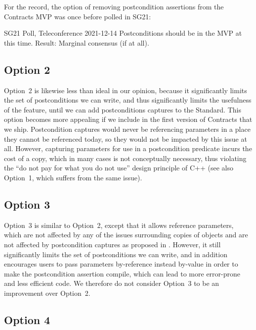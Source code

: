For the record, the option of removing postcondition assertions from the Contracts MVP was once before polled in SG21:

\begin{wgpoll}{SG21 Poll, Teleconference 2021-12-14}
Postconditions should be in the MVP at this time.
Result: Marginal consensus (if at all).
\end{wgpoll}

\subsection*{Option 2}

Option~2 is likewise less than ideal in our opinion, because it significantly limits the set of postconditions we can write, and thus significantly limits the usefulness of the feature, until we can add postconditions captures \cite{P3098R0} to the Standard. This option becomes more appealing if we include \cite{P3098R0} in the first version of Contracts that we ship. Postcondition captures would never be referencing parameters in a place they cannot be referenced today, so they would not be impacted by this issue at all. However, capturing parameters for use in a postcondition predicate incurs the cost of a copy, which in many cases is not conceptually necessary, thus violating the ``do not pay for what you do not use'' design principle of C++ (see also \cite{D3484R1} Option~1, which suffers from the same issue).

\subsection*{Option 3}

Option~3 is similar to Option~2, except that it allows reference parameters, which are not affected by any of the issues surrounding copies of objects and are not affected by postcondition captures as proposed in \cite{P3098R0}. However, it still significantly limits the set of postconditions we can write, and in addition encourages users to pass parameters by-reference instead by-value in order to make the postcondition assertion compile, which can lead to more error-prone and less efficient code. We therefore do not consider Option~3 to be an improvement over Option~2.

\subsection*{Option 4}

